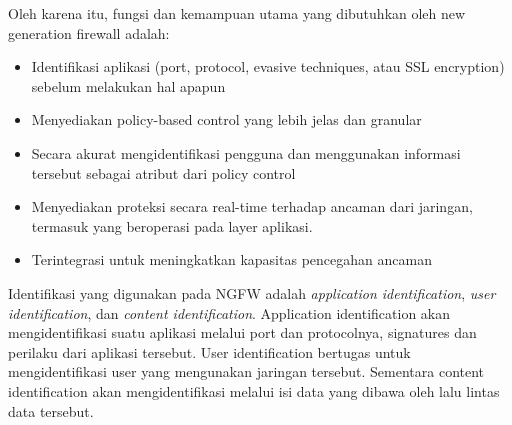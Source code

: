 Oleh karena itu, fungsi dan kemampuan utama yang dibutuhkan oleh new generation firewall adalah:
\begin{itemize}
	\item Identifikasi aplikasi (port, protocol, evasive techniques, atau SSL encryption) sebelum melakukan hal apapun
	\item Menyediakan policy-based control yang lebih jelas dan granular
	\item Secara akurat mengidentifikasi pengguna dan menggunakan informasi tersebut sebagai atribut dari policy control
	\item Menyediakan proteksi secara real-time terhadap ancaman dari jaringan, termasuk yang beroperasi pada layer aplikasi.
	\item Terintegrasi untuk meningkatkan kapasitas pencegahan ancaman
\end{itemize}

Identifikasi yang digunakan pada NGFW adalah \textit{application identification}, \textit{user identification}, dan \textit{content identification}. Application identification akan mengidentifikasi suatu aplikasi melalui port dan protocolnya, signatures dan perilaku dari aplikasi tersebut. User identification bertugas untuk mengidentifikasi user yang mengunakan jaringan tersebut. Sementara content identification akan mengidentifikasi melalui isi data yang dibawa oleh lalu lintas data tersebut. \\

